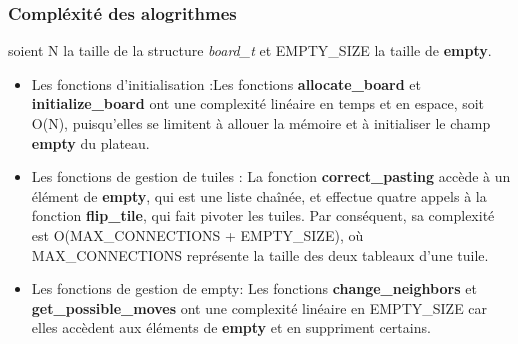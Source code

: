 \subsubsection{Compléxité des alogrithmes}
soient N la taille de la structure \textit{board\_t} et \footnotesize {EMPTY\_SIZE} la taille de \textbf{empty}.
\begin{itemize}
    \item Les fonctions d'initialisation :Les fonctions \textbf{allocate\_board} et \textbf{initialize\_board} ont une complexité linéaire en temps et en espace, soit O(N), puisqu'elles se limitent à allouer la mémoire et à initialiser le champ \textbf{empty} du plateau.
    \item Les fonctions de gestion de tuiles : La fonction \textbf{correct\_pasting} accède à un élément de \textbf{empty}, qui est une liste chaînée, et effectue quatre appels à la fonction \textbf{flip\_tile}, qui fait pivoter les tuiles. Par conséquent, sa complexité est O(\footnotesize{MAX\_CONNECTIONS + EMPTY\_SIZE}), où \footnotesize{MAX\_CONNECTIONS} représente la taille des deux tableaux d'une tuile.
    \item Les fonctions de gestion de empty: Les fonctions \textbf{change\_neighbors} et \textbf{get\_possible\_moves} ont une complexité linéaire en \footnotesize{EMPTY\_SIZE} car elles accèdent aux éléments de \textbf{empty} et en suppriment certains.
\end{itemize}
